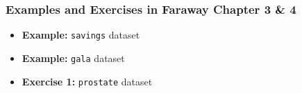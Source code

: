 \documentclass[serif,mathserif,professionalfont]{beamer}
\begin{document}
\begin{frame}
	
	\frametitle{Examples and Exercises in Faraway Chapter 3 \& 4}
	
	
	\begin{itemize}
		\item \textbf{Example:} \texttt{savings} dataset
		\item \textbf{Example:} \texttt{gala} dataset
		\item \textbf{Exercise 1:} \texttt{prostate} dataset
	\end{itemize}
	
	
	
\end{frame}


















%
%	
%	
%    
%    	
%      
%    	
%    	
%    	
%    	
%    	
%    	
%
%
\end{document}
